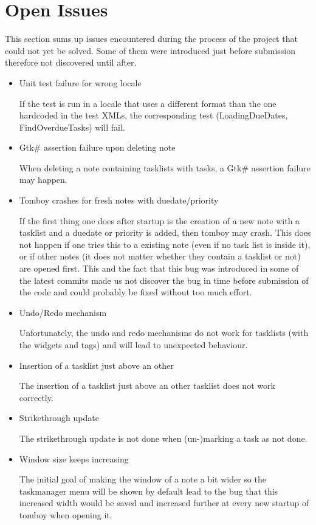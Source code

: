 \section{Open Issues}
\label{issues}

This section sums up issues encountered during the process of the project that could not yet be solved.
Some of them were introduced just before submission therefore not discovered until after.

\begin{itemize}
\item Unit test failure for wrong locale

  If the test is run in a locale that uses a different format than the one hardcoded in the test XMLs, the corresponding test (LoadingDueDates, FindOverdueTasks) will fail.

\item Gtk\# assertion failure upon deleting note

  When deleting a note containing tasklists with tasks, a Gtk\# assertion failure may happen.

\item Tomboy crashes for fresh notes with duedate/priority

  If the first thing one does after startup is the creation of a new note with a tasklist and a duedate or priority is added, then tomboy may crash. This does not happen if one tries this to a existing note (even if no task list is inside it), or if other notes (it does not matter whether they contain a tasklist or not) are opened first. 
This and the fact that this bug was introduced in some of the latest commits made us not discover the bug in time before submission of the code and could probably be fixed without too much effort.

\item Undo/Redo mechanism

  Unfortunately, the undo and redo mechanisms do not work for tasklists (with the widgets and tags) and will lead to unexpected behaviour.

\item Insertion of a tasklist just above an other

  The insertion of a tasklist just above an other tasklist does not work correctly.

\item Strikethrough update
  
  The strikethrough update is not done when (un-)marking a task as not done.

\item Window size keeps increasing

  The initial goal of making the window of a note a bit wider so the taskmanager menu will be shown by default lead to the bug that this increased width would be saved and increased further at every new startup of tomboy when opening it.

\end{itemize}